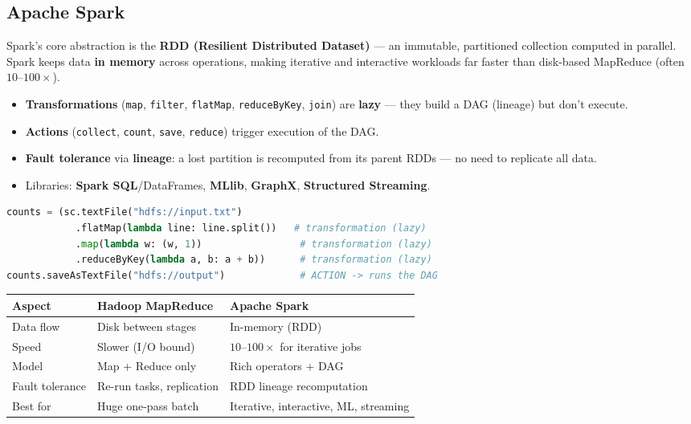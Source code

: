 \documentclass[11pt,a4paper]{article}
\begin{document}
\subsection{Apache Spark}
\begin{conceptbox}
Spark's core abstraction is the \textbf{RDD (Resilient Distributed Dataset)} --- an immutable, partitioned collection computed in parallel. Spark keeps data \textbf{in memory} across operations, making iterative and interactive workloads far faster than disk-based MapReduce (often $10$--$100\times$).
\end{conceptbox}

\begin{itemize}[leftmargin=*, itemsep=2pt]
  \item \textbf{Transformations} (\texttt{map}, \texttt{filter}, \texttt{flatMap}, \texttt{reduceByKey}, \texttt{join}) are \textbf{lazy} --- they build a DAG (lineage) but don't execute.
  \item \textbf{Actions} (\texttt{collect}, \texttt{count}, \texttt{save}, \texttt{reduce}) trigger execution of the DAG.
  \item \textbf{Fault tolerance} via \textbf{lineage}: a lost partition is recomputed from its parent RDDs --- no need to replicate all data.
  \item Libraries: \textbf{Spark SQL}/DataFrames, \textbf{MLlib}, \textbf{GraphX}, \textbf{Structured Streaming}.
\end{itemize}

\begin{examplebox}
\begin{lstlisting}[language=Python]
counts = (sc.textFile("hdfs://input.txt")
            .flatMap(lambda line: line.split())   # transformation (lazy)
            .map(lambda w: (w, 1))                 # transformation (lazy)
            .reduceByKey(lambda a, b: a + b))      # transformation (lazy)
counts.saveAsTextFile("hdfs://output")             # ACTION -> runs the DAG
\end{lstlisting}
\end{examplebox}

\begin{longtable}{@{}p{3.6cm}p{5.0cm}p{5.0cm}@{}}
\toprule
\rowcolor{primary!15}
\textbf{Aspect} & \textbf{Hadoop MapReduce} & \textbf{Apache Spark} \\
\midrule
\endhead
Data flow & Disk between stages & In-memory (RDD) \\
Speed & Slower (I/O bound) & $10$--$100\times$ for iterative jobs \\
Model & Map + Reduce only & Rich operators + DAG \\
Fault tolerance & Re-run tasks, replication & RDD lineage recomputation \\
Best for & Huge one-pass batch & Iterative, interactive, ML, streaming \\
\bottomrule
\end{longtable}
\end{document}
